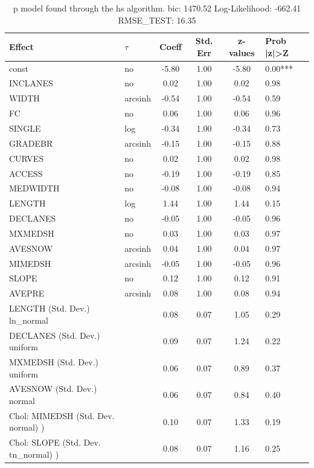 \begin{table}
	\caption{p model found through the hs algorithm. bic: 1470.52 Log-Likelihood: -662.41 RMSE_TEST: 16.35}
	\begin{center}
		\begin{tabular}{|l|l|c|c|c|l|}
			\hline
			Effect & $\tau$ & Coeff & Std. Err & z-values & Prob |z|>Z \\
			\hline
			const & no & -5.80 & 1.00 & -5.80 & 0.00*** \\
			\hline
			INCLANES & no & 0.02 & 1.00 & 0.02 & 0.98 \\
			\hline
			WIDTH & arcsinh & -0.54 & 1.00 & -0.54 & 0.59 \\
			\hline
			FC & no & 0.06 & 1.00 & 0.06 & 0.96 \\
			\hline
			SINGLE & log & -0.34 & 1.00 & -0.34 & 0.73 \\
			\hline
			GRADEBR & arcsinh & -0.15 & 1.00 & -0.15 & 0.88 \\
			\hline
			CURVES & no & 0.02 & 1.00 & 0.02 & 0.98 \\
			\hline
			ACCESS & no & -0.19 & 1.00 & -0.19 & 0.85 \\
			\hline
			MEDWIDTH & no & -0.08 & 1.00 & -0.08 & 0.94 \\
			\hline
			LENGTH & log & 1.44 & 1.00 & 1.44 & 0.15 \\
			\hline
			DECLANES & no & -0.05 & 1.00 & -0.05 & 0.96 \\
			\hline
			MXMEDSH & no & 0.03 & 1.00 & 0.03 & 0.97 \\
			\hline
			AVESNOW & arcsinh & 0.04 & 1.00 & 0.04 & 0.97 \\
			\hline
			MIMEDSH & arcsinh & -0.05 & 1.00 & -0.05 & 0.96 \\
			\hline
			SLOPE & no & 0.12 & 1.00 & 0.12 & 0.91 \\
			\hline
			AVEPRE & arcsinh & 0.08 & 1.00 & 0.08 & 0.94 \\
			\hline
			LENGTH (Std. Dev.) ln_normal &  & 0.08 & 0.07 & 1.05 & 0.29 \\
			\hline
			DECLANES (Std. Dev.) uniform &  & 0.09 & 0.07 & 1.24 & 0.22 \\
			\hline
			MXMEDSH (Std. Dev.) uniform &  & 0.06 & 0.07 & 0.89 & 0.37 \\
			\hline
			AVESNOW (Std. Dev.) normal &  & 0.06 & 0.07 & 0.84 & 0.40 \\
			\hline
			 Chol: MIMEDSH (Std. Dev. normal) ) &  & 0.10 & 0.07 & 1.33 & 0.19 \\
			\hline
			 Chol: SLOPE (Std. Dev. tn_normal) ) &  & 0.08 & 0.07 & 1.16 & 0.25 \\

\end{tabular}
\end{center}
\end{table}
